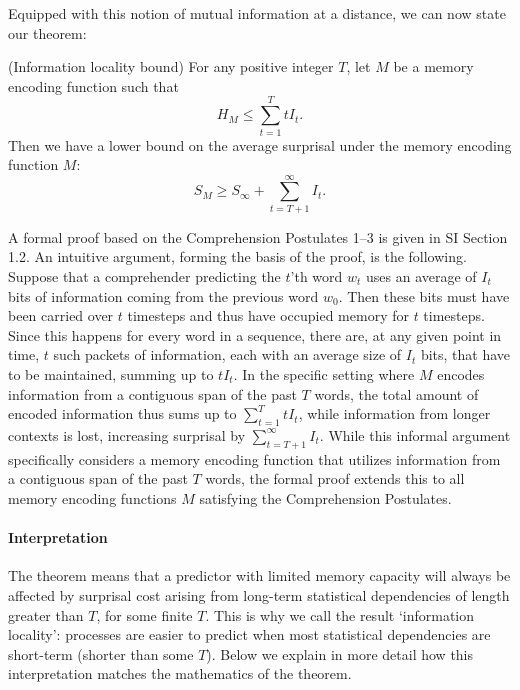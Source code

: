Equipped with this notion of mutual information at a distance, we can now state our theorem:
\begin{thm}\label{prop:suboptimal}(Information locality bound)
For any positive integer $T$, let $M$ be a memory encoding function such that
\begin{equation}
\label{eq:memory-bound}
H_M \le \sum_{t=1}^T t I_t.    
\end{equation}
Then we have a lower bound on the average surprisal under the memory encoding function $M$:
\begin{equation}
\label{eq:surprisal-bound}
S_M \ge S_\infty + \sum_{t=T+1}^\infty I_t.
\end{equation}
\end{thm}
A formal proof based on the Comprehension Postulates 1--3 is given in SI Section 1.2.
An intuitive argument, forming the basis of the proof, is the following.
Suppose that a comprehender predicting the $t$'th word $w_t$ uses an average of $I_t$ bits of information coming from the previous word $w_0$. 
Then these bits must have been carried over $t$ timesteps and thus have occupied memory for $t$ timesteps.
Since this happens for every word in a sequence, there are, at any given point in time, $t$ such packets of information, each with an average size of $I_t$ bits, that have to be maintained, summing up to $t I_t$.
In the specific setting where $M$ encodes information from a contiguous span of the past $T$ words, the total amount of encoded information thus sums up to $\sum_{t=1}^T t I_t$, while information from longer contexts is lost, increasing surprisal by $\sum_{t=T+1}^\infty I_t$.
While this informal argument specifically considers a memory encoding function that utilizes information from a contiguous span of the past $T$ words, the formal proof extends this to all memory encoding functions $M$ satisfying the Comprehension Postulates.

\paragraph{Interpretation} The theorem means that a predictor with limited memory capacity will always be affected by surprisal cost arising from long-term statistical dependencies of length greater than $T$, for some finite $T$. This is why we call the result `information locality': processes are easier to predict when most statistical dependencies are short-term (shorter than some $T$). Below we explain in more detail how this interpretation matches the mathematics of the theorem.


